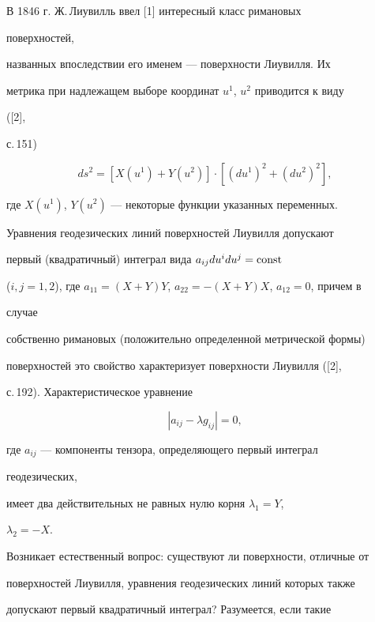 \label{begin} 


 


В 1846 г. Ж.\,Лиувилль ввел [1] интересный класс римановых 


поверхностей, 


названных впоследствии его именем --- поверхности Лиувилля. Их 


метрика при надлежащем выборе координат $u^1$, $u^2$ приводится к виду 


([2], 


с.\,151) 


$$ 


ds^2=[X(u^1)+Y(u^2)]\cdot[(du^1)^2+(du^2)^2], 


$$ 


где $X(u^1)$, $Y(u^2)$ --- некоторые функции указанных переменных. 


Уравнения геодезических линий поверхностей Лиувилля допускают 


первый (квадратичный) интеграл вида $a_{ij}du^i du^j=\operatorname{const}$


($i,j=1,2$), где $a_{11}=(X+Y)Y$, $a_{22}=-(X+Y)X$, $a_{12}=0$, причем в 


случае  


собственно римановых (положительно определенной метрической формы) 


поверхностей это свойство характеризует поверхности Лиувилля ([2], 


с.\,192). Характеристическое уравнение 


\begin{equation} 


|a_{ij}-\lambda g_{ij}|=0, 


\end{equation} 


где $a_{ij}$ --- компоненты тензора, определяющего первый интеграл 


геодезических, 


имеет два действительных не равных нулю корня $\lambda_1=Y$, 


$\lambda_2=-X$. 


 


Возникает естественный вопрос: существуют ли поверхности, отличные от 


поверхностей Лиувилля, уравнения геодезических линий которых также 


допускают первый квадратичный интеграл? Разумеется, если такие 


